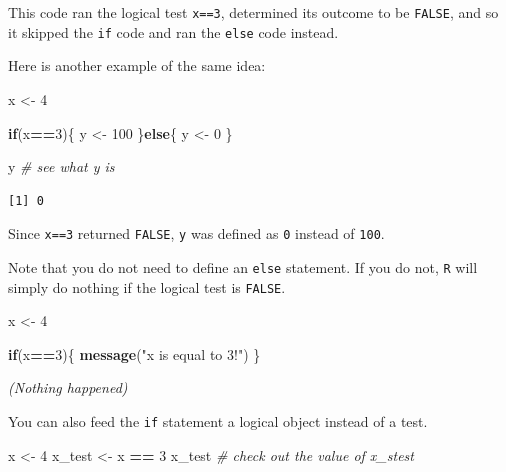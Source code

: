 \documentclass[
]{book}
\newenvironment{Shaded}{\begin{snugshade}}{\end{snugshade}}
\newcommand{\CommentTok}[1]{\textcolor[rgb]{0.56,0.35,0.01}{\textit{#1}}}
\newcommand{\ControlFlowTok}[1]{\textcolor[rgb]{0.13,0.29,0.53}{\textbf{#1}}}
\newcommand{\DecValTok}[1]{\textcolor[rgb]{0.00,0.00,0.81}{#1}}
\newcommand{\KeywordTok}[1]{\textcolor[rgb]{0.13,0.29,0.53}{\textbf{#1}}}
\newcommand{\NormalTok}[1]{#1}
\newcommand{\OperatorTok}[1]{\textcolor[rgb]{0.81,0.36,0.00}{\textbf{#1}}}
\newcommand{\StringTok}[1]{\textcolor[rgb]{0.31,0.60,0.02}{#1}}
\begin{document}
This code ran the logical test \texttt{x==3}, determined its outcome to be \texttt{FALSE}, and so it skipped the \texttt{if} code and ran the \texttt{else} code instead.

Here is another example of the same idea:

\begin{Shaded}
\begin{Highlighting}[]
\NormalTok{x <-}\StringTok{ }\DecValTok{4}

\ControlFlowTok{if}\NormalTok{(x}\OperatorTok{==}\DecValTok{3}\NormalTok{)\{}
\NormalTok{  y <-}\StringTok{ }\DecValTok{100}
\NormalTok{\}}\ControlFlowTok{else}\NormalTok{\{}
\NormalTok{  y <-}\StringTok{ }\DecValTok{0}
\NormalTok{\}}

\NormalTok{y }\CommentTok{# see what y is}
\end{Highlighting}
\end{Shaded}

\begin{verbatim}
[1] 0
\end{verbatim}

Since \texttt{x==3} returned \texttt{FALSE}, \texttt{y} was defined as \texttt{0} instead of \texttt{100}.

Note that you do not need to define an \texttt{else} statement. If you do not, \texttt{R} will simply do nothing if the logical test is \texttt{FALSE}.

\begin{Shaded}
\begin{Highlighting}[]
\NormalTok{x <-}\StringTok{ }\DecValTok{4}

\ControlFlowTok{if}\NormalTok{(x}\OperatorTok{==}\DecValTok{3}\NormalTok{)\{}
  \KeywordTok{message}\NormalTok{(}\StringTok{"x is equal to 3!"}\NormalTok{)}
\NormalTok{\}}
\end{Highlighting}
\end{Shaded}

\emph{(Nothing happened)}

You can also feed the \texttt{if} statement a logical object instead of a test.

\begin{Shaded}
\begin{Highlighting}[]
\NormalTok{x <-}\StringTok{ }\DecValTok{4}
\NormalTok{x_test <-}\StringTok{ }\NormalTok{x }\OperatorTok{==}\StringTok{ }\DecValTok{3}
\NormalTok{x_test }\CommentTok{# check out the value of x_stest}
\end{Highlighting}
\end{Shaded}
\end{document}
